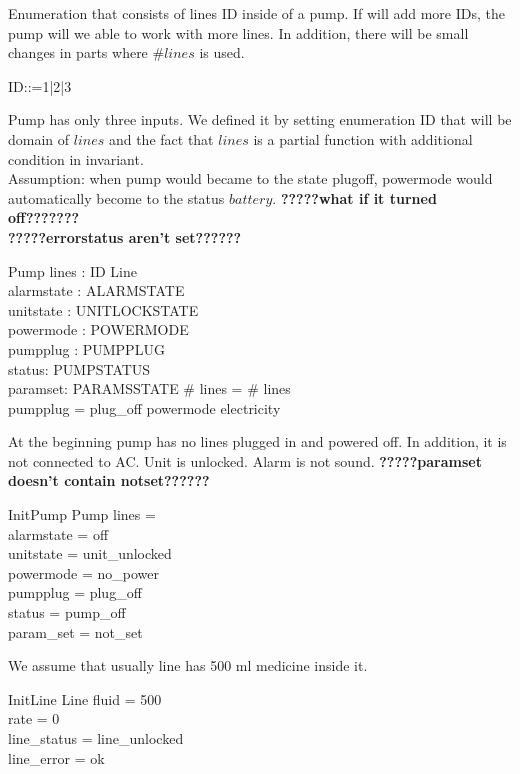 \documentclass{article}
\begin{document}
	Enumeration that consists of lines ID inside of a pump. If will add more IDs, the pump will we able to work with more lines. In addition, there will be small changes in parts where $\# lines$ is used.
	\begin{zed}
		ID::=1|2|3
	\end{zed}
	
	Pump has only three inputs. We defined it by setting enumeration ID that will be domain of $lines$ and the fact that $lines$ is a partial function with additional condition in invariant.\\
		Assumption: when pump would became to the state plugoff, powermode would automatically become to the status $battery$. \textbf{?????what if it turned off???????}\\
	
	\textbf{?????errorstatus aren't set??????}
	\begin{schema}{Pump}
		lines : ID \pfun Line \\
		alarmstate : ALARMSTATE \\
		unitstate : UNITLOCKSTATE \\
		powermode : POWERMODE \\
		pumpplug : PUMPPLUG \\
		status: PUMPSTATUS \\
		paramset: PARAMSSTATE
	\where
		\# \ran lines = \# \dom lines \\
		pumpplug = plug\_off \implies powermode \neq electricity 
	\end{schema}
	
	
	At the beginning pump has no lines plugged in and powered off. In addition, it is not connected to AC. Unit is unlocked. Alarm is not sound. 
	\textbf{?????paramset doesn't contain notset??????}
		
	
	\begin{schema}{InitPump}
		Pump
		\where
		lines = \emptyset \\
		alarmstate = off \\
		unitstate  = unit\_unlocked \\
		powermode =  no\_power \\
		pumpplug = plug\_off \\
		status = pump\_off\\
		param\_set = not\_set	
	\end{schema}
	
	We assume that usually line has 500 ml medicine inside it.
	\begin{schema}{InitLine}
		Line
		\where
		fluid = 500 \\
		rate = 0 \\
		line\_status = line\_unlocked\\
		line\_error = ok \\
	\end{schema}
\end{document}
